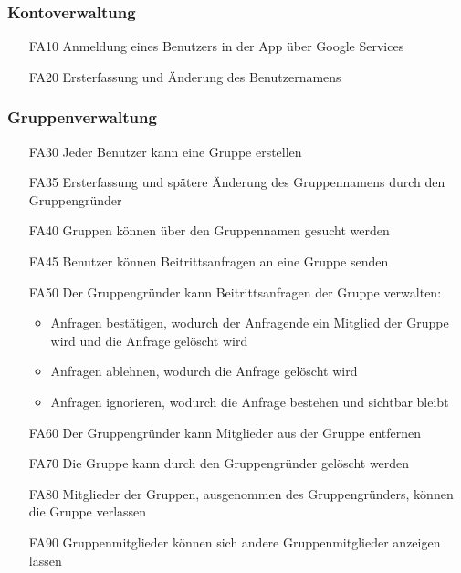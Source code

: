 \documentclass{scrartcl}
\begin{document}
	\subsubsection{Kontoverwaltung}
	\begin{itemize}
		\item[FA10] Anmeldung eines Benutzers in der App über Google Services
		\item[FA20] Ersterfassung und Änderung des Benutzernamens
	\end{itemize}
	
	\subsubsection{Gruppenverwaltung}
	\begin{itemize}
		\item[FA30] Jeder Benutzer kann eine Gruppe erstellen
		\item[FA35] Ersterfassung und spätere Änderung des Gruppennamens durch den Gruppengründer
		\item[FA40] Gruppen können über den Gruppennamen gesucht werden
		\item[FA45] Benutzer können Beitrittsanfragen an eine Gruppe senden
		\item[FA50] Der Gruppengründer kann Beitrittsanfragen der Gruppe verwalten:
		\begin{itemize}
			\item Anfragen bestätigen, wodurch der Anfragende ein Mitglied der Gruppe wird und die Anfrage gelöscht wird
			\item Anfragen ablehnen, wodurch die Anfrage gelöscht wird
			\item Anfragen ignorieren, wodurch die Anfrage bestehen und sichtbar bleibt
		\end{itemize}
		\item[FA60] Der Gruppengründer kann Mitglieder aus der Gruppe entfernen
		\item[FA70] Die Gruppe kann durch den Gruppengründer gelöscht werden
		\item[FA80] Mitglieder der Gruppen, ausgenommen des Gruppengründers, können die Gruppe verlassen
		\item[FA90] Gruppenmitglieder können sich andere Gruppenmitglieder anzeigen lassen
	\end{itemize}
	
\end{document}
